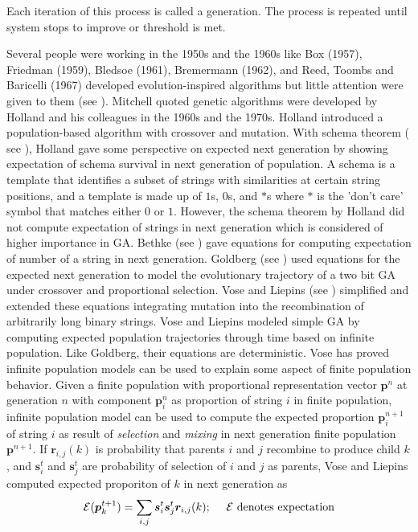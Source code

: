 Each iteration of this process is called a generation. 
The process is repeated until system stops to improve or threshold is met.

Several people were working in the 1950s and the 1960s like Box (1957), Friedman (1959),
Bledsoe (1961), Bremermann (1962), and Reed, Toombs and Baricelli (1967) developed evolution-inspired algorithms 
but little attention were given to them (see \cite{Mitchell1999}). Mitchell quoted genetic algorithms were developed by Holland 
and his colleagues in the 1960s and the 1970s. Holland introduced a population-based algorithm with crossover and mutation. 
With schema theorem ( see \cite{Holland1975}), 
Holland gave some perspective on expected next generation by showing expectation of schema survival in 
next generation of population. A schema is a template that identifies a subset of strings with similarities 
at certain string positions, and a template is made up of $1$s, $0$s, and $\ast$s where 
$\ast$ is the 'don't care' symbol that matches either $0$ or $1$. However, the schema theorem by Holland 
did not compute expectation of strings in next generation which is considered of higher importance in GA. 
Bethke (see \cite{Bethke1981}) gave equations for computing expectation of number of a string in next generation. 
Goldberg (see \cite{Goldberg1987}) used equations 
for the expected next generation to model the evolutionary trajectory of a two bit GA under crossover 
and proportional selection. Vose and Liepins (see \cite{VoseLiepins1991}) simplified and extended 
these equations integrating mutation into the recombination of arbitrarily long binary strings. 
Vose and Liepins modeled simple GA by computing expected population trajectories through time based 
on infinite population. Like Goldberg, their equations are deterministic. 
Vose has proved infinite population models can be used  to explain some aspect of finite population behavior. 
Given a finite population with proportional representation vector $\bm{p}^n$ at generation $n$ with 
component $\bm{p}_i^n$ as proportion of string $i$ in finite population, infinite population model 
can be used to compute the expected proportion $\bm{p}_i^{n+1}$ of string $i$ as result of \textit{selection} and 
\textit{mixing} in next generation finite population $\bm{p}^{n+1}$.  
If $\bm{r}_{i,j}(k)$ is probability that parents $i$ and $j$ recombine to produce child $k$, and $\bm{s}_i^t$ and $\bm{s}_j^t$ 
are probability of selection of $i$ and $j$ as parents, Vose and Liepins computed expected proporiton of $k$ in next generation as
\[
\mathcal{E}(\bm{p}_k^{t+1}) = \sum_{i,j} \bm{s}_i^t \bm{s}_j^t \bm{r}_{i,j}(k) ; \text{\hspace{10pt} $\mathcal{E}$ denotes expectation}
\]
